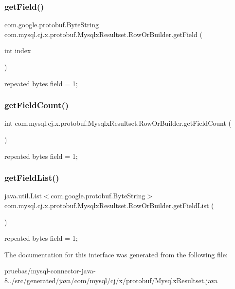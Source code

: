 \subsubsection{\texorpdfstring{get\+Field()}{getField()}}
{\footnotesize\ttfamily com.\+google.\+protobuf.\+Byte\+String com.\+mysql.\+cj.\+x.\+protobuf.\+Mysqlx\+Resultset.\+Row\+Or\+Builder.\+get\+Field (\begin{DoxyParamCaption}\item[{int}]{index }\end{DoxyParamCaption})}

{\ttfamily repeated bytes field = 1;} \mbox{\label{interfacecom_1_1mysql_1_1cj_1_1x_1_1protobuf_1_1_mysqlx_resultset_1_1_row_or_builder_a353ab4361cfa21b39195ed78d9d5527b}} 
\subsubsection{\texorpdfstring{get\+Field\+Count()}{getFieldCount()}}
{\footnotesize\ttfamily int com.\+mysql.\+cj.\+x.\+protobuf.\+Mysqlx\+Resultset.\+Row\+Or\+Builder.\+get\+Field\+Count (\begin{DoxyParamCaption}{ }\end{DoxyParamCaption})}

{\ttfamily repeated bytes field = 1;} \mbox{\label{interfacecom_1_1mysql_1_1cj_1_1x_1_1protobuf_1_1_mysqlx_resultset_1_1_row_or_builder_a8e930d8dbfadedb6077e2c7b6e3a96a7}} 
\subsubsection{\texorpdfstring{get\+Field\+List()}{getFieldList()}}
{\footnotesize\ttfamily java.\+util.\+List$<$com.\+google.\+protobuf.\+Byte\+String$>$ com.\+mysql.\+cj.\+x.\+protobuf.\+Mysqlx\+Resultset.\+Row\+Or\+Builder.\+get\+Field\+List (\begin{DoxyParamCaption}{ }\end{DoxyParamCaption})}

{\ttfamily repeated bytes field = 1;} 

The documentation for this interface was generated from the following file\+:\begin{DoxyCompactItemize}
\item 
pruebas/mysql-\/connector-\/java-\/8../src/generated/java/com/mysql/cj/x/protobuf/Mysqlx\+Resultset.\+java\end{DoxyCompactItemize}
